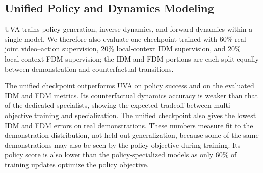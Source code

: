 \newpage

\subsection{Unified Policy and Dynamics Modeling}

UVA trains policy generation, inverse dynamics, and forward dynamics within a
single model. We therefore also evaluate one \ours checkpoint trained with
60\% real joint video--action supervision, 20\% local-context IDM supervision,
and 20\% local-context FDM supervision; the IDM and FDM portions are each split
equally between demonstration and counterfactual transitions.

The unified \ours checkpoint outperforms UVA on policy success and on the
evaluated IDM and FDM metrics. Its counterfactual dynamics accuracy is weaker
than that of the dedicated specialists, showing the expected tradeoff between
multi-objective training and specialization. The unified \ours checkpoint also gives the lowest IDM and FDM errors on real
demonstrations. These numbers measure fit to the demonstration distribution,
not held-out generalization, because some of the same demonstrations may also
be seen by the policy objective during training. Its policy score is also lower
than the policy-specialized \ours models as only 60\% of training updates
optimize the policy objective.
